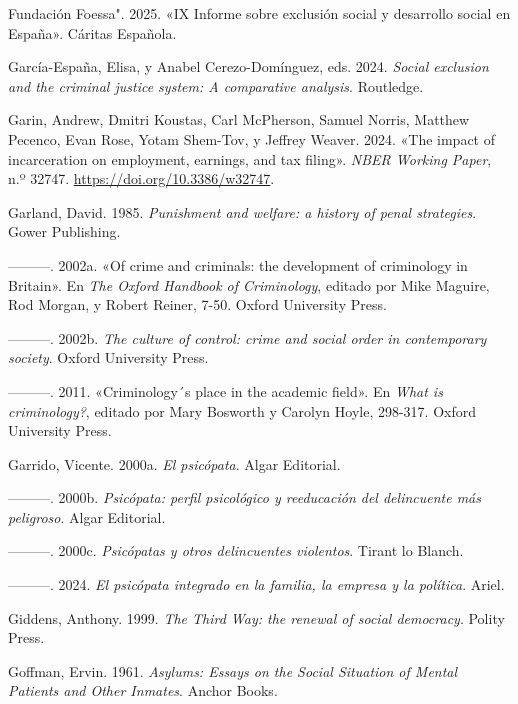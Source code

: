 \documentclass[
  spanish,
  letterpaper,
  DIV=11,
  numbers=noendperiod]{scrreprt}
\newlength{\cslhangindent}
\newenvironment{CSLReferences}[2] %
 {\begin{list}{}{%
  \setlength{\itemindent}{0pt}
  \setlength{\leftmargin}{0pt}
  \setlength{\parsep}{0pt}
  \ifodd #1
   \setlength{\leftmargin}{\cslhangindent}
   \setlength{\itemindent}{-1\cslhangindent}
  \fi
  \setlength{\itemsep}{#2\baselineskip}}}
 {\end{list}}
\begin{document}
\begin{CSLReferences}{1}{0}
Fundación Foessa". 2025. {«IX Informe sobre exclusión social y
desarrollo social en España»}. Cáritas Española.

García-España, Elisa, y Anabel Cerezo-Domínguez, eds. 2024. \emph{Social
exclusion and the criminal justice system: A comparative analysis}.
Routledge.

Garin, Andrew, Dmitri Koustas, Carl McPherson, Samuel Norris, Matthew
Pecenco, Evan Rose, Yotam Shem-Tov, y Jeffrey Weaver. 2024. {«The impact
of incarceration on employment, earnings, and tax filing»}. \emph{NBER
Working Paper}, n.º 32747. \url{https://doi.org/10.3386/w32747}.

Garland, David. 1985. \emph{Punishment and welfare: a history of penal
strategies}. Gower Publishing.

---------. 2002a. {«Of crime and criminals: the development of
criminology in Britain»}. En \emph{The Oxford Handbook of Criminology},
editado por Mike Maguire, Rod Morgan, y Robert Reiner, 7-50. Oxford
University Press.

---------. 2002b. \emph{The culture of control: crime and social order
in contemporary society}. Oxford University Press.

---------. 2011. {«Criminology´s place in the academic field»}. En
\emph{What is criminology?}, editado por Mary Bosworth y Carolyn Hoyle,
298-317. Oxford University Press.

Garrido, Vicente. 2000a. \emph{El psicópata}. Algar Editorial.

---------. 2000b. \emph{Psicópata: perfil psicológico y reeducación del
delincuente más peligroso}. Algar Editorial.

---------. 2000c. \emph{Psicópatas y otros delincuentes violentos}.
Tirant lo Blanch.

---------. 2024. \emph{El psicópata integrado en la familia, la empresa
y la política}. Ariel.

Giddens, Anthony. 1999. \emph{The Third Way: the renewal of social
democracy}. Polity Press.

Goffman, Ervin. 1961. \emph{Asylums: Essays on the Social Situation of
Mental Patients and Other Inmates}. Anchor Books.


\end{CSLReferences}
\end{document}
